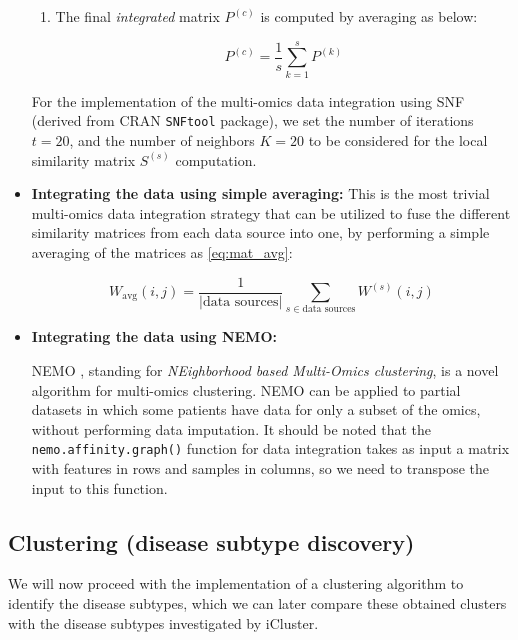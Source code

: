 \begin{itemize}[]
\begin{enumerate}[\IEEEsetlabelwidth{12)}]
        \item The final \textit{integrated} matrix $P^{(c)}$ is computed by averaging as below:

        \begin{equation}
            \label{eq:consensus}
            P^{(c)} = \frac{1}{s} \sum_{k=1}^{s} P^{(k)}
        \end{equation}
    \end{enumerate}

    For the implementation of the multi-omics data integration using SNF (derived from CRAN \verb|SNFtool| package), we set the number of iterations $t = 20$, and the number of neighbors $K = 20$ to be considered for the local similarity matrix $S^{(s)}$ computation.
    
    \item \textbf{Integrating the data using simple averaging:} This is the most trivial multi-omics data integration strategy that can be utilized to fuse the different similarity matrices from each data source into one, by performing a simple averaging of the matrices as \eqref{eq:mat_avg}:

    \begin{equation}
        \label{eq:mat_avg}
         W_{\text{avg}}(i,j) = \frac{1}{|\text{{data sources}}|} \sum_{s \in \text{{data sources}}} W^{(s)}(i,j) 
    \end{equation}

    \item \textbf{Integrating the data using NEMO:}

    NEMO \cite{rappoport2019nemo}, standing for \textit{NEighborhood based Multi-Omics clustering}, is a novel algorithm for multi-omics clustering. NEMO can be applied to partial datasets in which some patients have data for only a subset of the omics, without performing data imputation. It should be noted that the \verb|nemo.affinity.graph()| function for data integration takes as input a matrix with features in rows and samples in columns, so we need to transpose the input to this function.
\end{itemize}


\subsection{Clustering (disease subtype discovery)}

We will now proceed with the implementation of a clustering algorithm to identify the disease subtypes, which we can later compare these obtained clusters with the disease subtypes investigated by iCluster.

